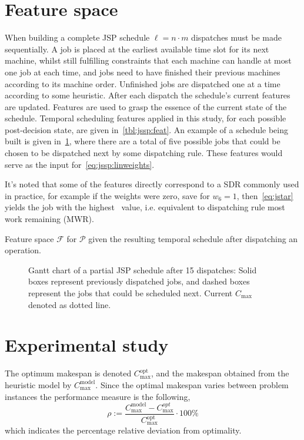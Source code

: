 \documentclass{acm_proc_article-sp}
\begin{document}
\section{Feature space}\label{sec:feat}
When building a complete JSP schedule $\ell=n\cdot m$ dispatches must be made sequentially. 
A job is placed at the earliest available time slot for its next machine, whilst still fulfilling constraints that each machine can handle at most one job at each time, and jobs need to have finished their previous machines according to its machine order. 
Unfinished jobs are dispatched one at a time according to some heuristic. After each dispatch the schedule's current features are updated.
Features are used to grasp the essence of the current state of the schedule. Temporal scheduling features applied in this study, for each possible post-decision state, are given in~\cref{tbl:jssp:feat}. An example of a schedule being built is given in~\cref{fig:jssp:example}, where there are a total of five possible jobs that could be chosen to be dispatched next by some dispatching rule. These features would serve as the input for~\cref{eq:jssp:linweights}. 

It's noted that some of the features directly correspond to a SDR commonly used in practice, for example if the weights were zero, save for $w_6=1$, then~\eqref{eq:jstar} yields the job with the highest \phiwrmJob\ value, i.e. equivalent  to dispatching rule most work remaining (MWR).


\begin{table}  
  \caption{Feature space $\mathcal{F}$ for $\mathcal{P}$ given the resulting temporal schedule after dispatching an operation.  }
  \label{tbl:jssp:feat}
  
\end{table}

\begin{figure}[t!]\centering 
{}
\caption[Gantt chart of a partial JSP schedule]{Gantt chart of a partial JSP schedule after 15 dispatches: Solid boxes represent previously dispatched jobs, and dashed boxes represent  the jobs
that could be scheduled next. Current $C_{\max}$ denoted as dotted line.}
\label{fig:jssp:example}
\end{figure}


\section{Experimental study}\label{sec:expr}
The optimum makespan is denoted 
$C_{\max}^{\text{opt}}$, and the makespan obtained from the heuristic model by $C_{\max}^{\text{model}}$. Since 
the optimal makespan varies between problem instances the performance measure is the following, 
\begin{equation}\label{eq:ratio}\rho :=\frac{C_{\max}^{\text{model}}-C_{\max}^{opt}}{C_{\max}^{\text{opt}}}\cdot 
100\%\end{equation}
which indicates the percentage relative deviation from optimality. 
\end{document}

